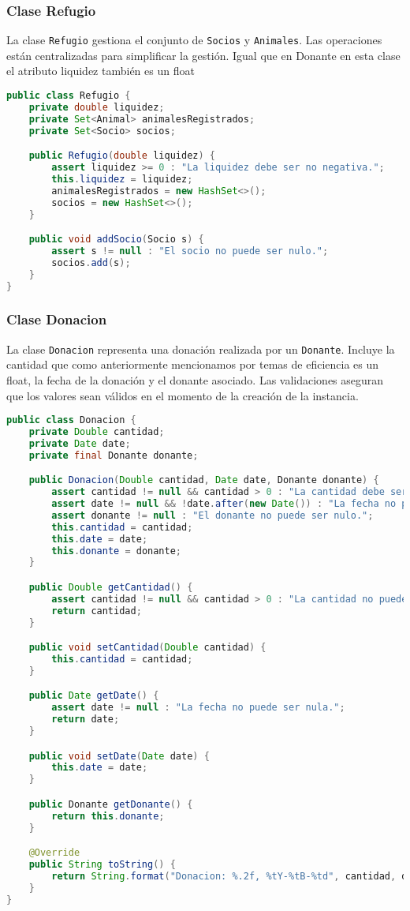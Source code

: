 \subsubsection{Clase Refugio}
La clase \texttt{Refugio} gestiona el conjunto de \texttt{Socios} y \texttt{Animales}. 
Las operaciones están centralizadas para simplificar la gestión. Igual que en Donante en esta clase
el atributo liquidez también es un float
\label{codigo:refugio}
\begin{lstlisting}[style = javaNormal, language=Java] 
public class Refugio {
    private double liquidez;
    private Set<Animal> animalesRegistrados;
    private Set<Socio> socios;

    public Refugio(double liquidez) {
        assert liquidez >= 0 : "La liquidez debe ser no negativa.";
        this.liquidez = liquidez;
        animalesRegistrados = new HashSet<>();
        socios = new HashSet<>();
    }

    public void addSocio(Socio s) {
        assert s != null : "El socio no puede ser nulo.";
        socios.add(s);
    }
}
\end{lstlisting}

\subsubsection{Clase Donacion}
La clase \texttt{Donacion} representa una donación realizada por un \texttt{Donante}. 
Incluye la cantidad que como anteriormente mencionamos por temas de eficiencia es un float,
la fecha de la donación y el donante asociado. Las validaciones 
aseguran que los valores sean válidos en el momento de la creación de la instancia.
\label{codigo:donacion}
\begin{lstlisting}[style = javaNormal, language=Java] 
public class Donacion {
    private Double cantidad;
    private Date date;
    private final Donante donante;

    public Donacion(Double cantidad, Date date, Donante donante) {
        assert cantidad != null && cantidad > 0 : "La cantidad debe ser positiva.";
        assert date != null && !date.after(new Date()) : "La fecha no puede ser nula ni estar en el futuro.";
        assert donante != null : "El donante no puede ser nulo.";
        this.cantidad = cantidad;
        this.date = date;
        this.donante = donante;
    }

    public Double getCantidad() {
        assert cantidad != null && cantidad > 0 : "La cantidad no puede ser nula.";
        return cantidad;
    }

    public void setCantidad(Double cantidad) {
        this.cantidad = cantidad;
    }

    public Date getDate() {
        assert date != null : "La fecha no puede ser nula.";
        return date;
    }

    public void setDate(Date date) {
        this.date = date;
    }

    public Donante getDonante() {
        return this.donante;
    }

    @Override
    public String toString() {
        return String.format("Donacion: %.2f, %tY-%tB-%td", cantidad, date, date, date);
    }
}
\end{lstlisting}
\label{codigo:adopcion}
